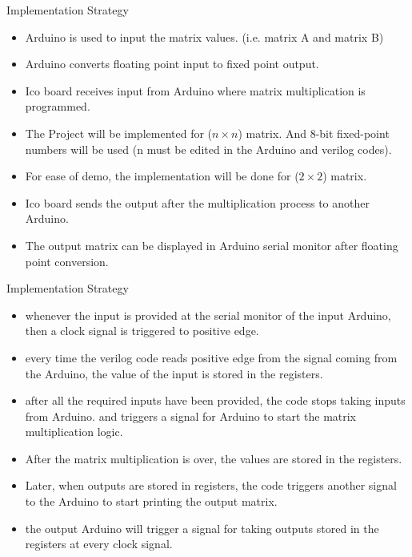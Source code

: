 \documentclass[10pt]{beamer}
\begin{document}
\begin{frame}[fragile]{Implementation Strategy}
	\begin{itemize}
		\item Arduino is used to input the matrix values. (i.e. matrix A and matrix B)
		\item Arduino converts floating point input to fixed point output. 
		\item Ico board receives input from Arduino where matrix multiplication is programmed.
		\item The Project will be implemented for (\(n\times n\)) matrix. And 8-bit fixed-point numbers will be used (n must be edited in the Arduino and verilog codes).
		\item For ease of demo, the implementation will be done for (\(2\times2\)) matrix.
		\item Ico board sends the output after the multiplication process to another Arduino.
		\item The output matrix can be displayed in Arduino serial monitor after floating point conversion.
	\end{itemize}
\end{frame}
\begin{frame}[fragile]{Implementation Strategy}
    \begin{itemize}
        \item whenever the input is provided at the serial monitor of the input Arduino, then a clock signal is triggered to positive edge.
        \item every time the verilog code reads positive edge from the signal coming from the Arduino, the value of the input is stored in the registers.
        \item after all the required inputs have been provided, the code stops taking inputs from Arduino. and triggers a signal for Arduino to start the matrix multiplication logic.
        \item After the matrix multiplication is over, the values are stored in the registers. 
        \item Later, when outputs are stored in registers, the code triggers another signal to the Arduino to start printing the output matrix.
        \item the output Arduino will trigger a signal for taking outputs stored in the registers at every clock signal.
    \end{itemize}
\end{frame}
\end{document}
